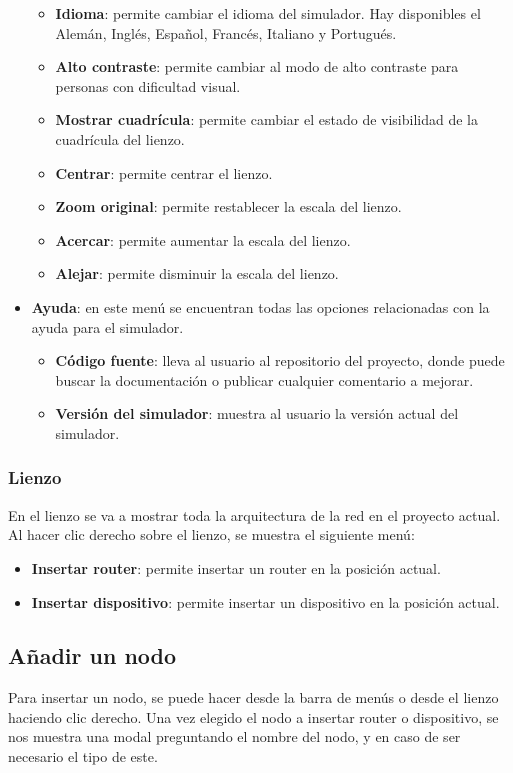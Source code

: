 \begin{itemize}
\begin{itemize}
        \item \textbf{Idioma}: permite cambiar el idioma del simulador. Hay disponibles el Alemán, Inglés, Español, Francés, Italiano y Portugués.
        \item \textbf{Alto contraste}: permite cambiar al modo de alto contraste para personas con dificultad visual.
        \item \textbf{Mostrar cuadrícula}: permite cambiar el estado de visibilidad de la cuadrícula del lienzo.
        \item \textbf{Centrar}: permite centrar el lienzo.
        \item \textbf{Zoom original}: permite restablecer la escala del lienzo.
        \item \textbf{Acercar}: permite aumentar la escala del lienzo.
        \item \textbf{Alejar}: permite disminuir la escala del lienzo.
    \end{itemize}
    \item \textbf{Ayuda}: en este menú se encuentran todas las opciones relacionadas con la ayuda para el simulador.
    \begin{itemize}
        \item \textbf{Código fuente}: lleva al usuario al repositorio del proyecto, donde puede buscar la documentación o publicar cualquier comentario a mejorar.
        \item \textbf{Versión del simulador}: muestra al usuario la versión actual del simulador.
    \end{itemize}
\end{itemize}

\subsubsection{Lienzo}
\label{subsubsec:Lienzo}

En el lienzo se va a mostrar toda la arquitectura de la red en el proyecto actual. Al hacer clic derecho sobre el lienzo, se muestra el siguiente menú:
\begin{itemize}
    \item \textbf{Insertar router}: permite insertar un router en la posición actual.
    \item \textbf{Insertar dispositivo}: permite insertar un dispositivo en la posición actual.
\end{itemize}

\subsection{Añadir un nodo}
\label{subsec:AnadirNodo}
Para insertar un nodo, se puede hacer desde la barra de menús o desde el lienzo haciendo clic derecho. Una vez elegido el nodo a insertar router o dispositivo, se nos muestra una modal preguntando el nombre del nodo, y en caso de ser necesario el tipo de este.

